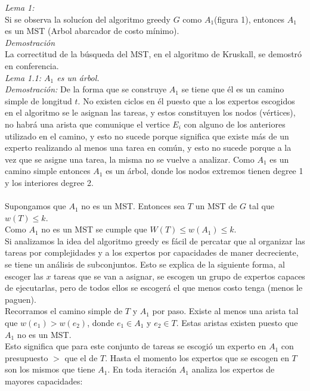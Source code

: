 \documentclass[10pt,letterpaper]{article}
\begin{document}
{ 	\textit{Lema 1:} \\
 	Si se observa la soluc\'ion del algoritmo greedy $G$ como $A_{1}$(figura 1), entonces $A_{1}$ es un MST (Arbol abarcador de costo m\'inimo). \\
 	\textit{Demostraci\'on} \\
 	La correctitud de la b\'usqueda del MST, en el algoritmo de Kruskall, se demostr\'o en conferencia. \\
 	\textit{Lema 1.1: $A_{1}$ es un \'arbol.}  \\
 	\textit{Demostraci\'on:} De la forma que se construye $A_{1}$ se tiene que \'el es un camino simple de longitud $t$. No existen ciclos en \'el puesto que a los expertos escogidos en el algoritmo se le asignan las tareas, y estos constituyen los nodos (v\'ertices), no habr\'a una arista que comunique el vertice $E_{i}$ con alguno de los anteriores utilizado en el camino, y esto no sucede porque significa que existe m\'as de un experto realizando al menos una tarea en com\'un, y esto no sucede porque a la vez que se asigne una tarea, la misma no se vuelve a analizar. Como $A_{1}$ es un camino simple entonces $A_{1}$ es un \'arbol, donde los nodos extremos tienen degree 1 y los interiores degree 2. \\ \\
 	Supongamos que $A_{1}$ no es un MST. Entonces sea $T$ un MST de $G$ tal que $w(T) \leq k$. \\
 	Como $A_{1}$ no es un MST se cumple que $W(T) \leq w(A_{1}) \leq k$. \\
 	Si analizamos la idea del algoritmo greedy es f\'acil de percatar que al organizar las tareas por complejidades y a los expertos por capacidades de maner decreciente, se tiene un an\'alisis de subconjuntos. Esto se explica de la siguiente forma, al escoger las $x$ tareas que se van a asignar, se escogen un grupo de expertos capaces de ejecutarlas, pero de todos ellos se escoger\'a el que menos costo tenga (menos le paguen). \\
 	Recorramos el camino simple de $T$ y $A_{1}$ por paso. Existe al menos una arista tal que $w(e_{1}) > w(e_{2})$, donde $e_{1} \in A_{1}$ y $e_{2} \in T$. Estas aristas existen puesto que $A_{1}$ no es un MST. \\
 	Esto significa que para este conjunto de tareas se escogi\'o un experto en $A_{1}$ con presupuesto $>$ que el de $T$. Hasta el momento los expertos que se escogen en $T$ son los mismos que tiene $A_{1}$. En toda iteraci\'on $A_{1}$ analiza los expertos de mayores capacidades: \\
}
\end{document}
